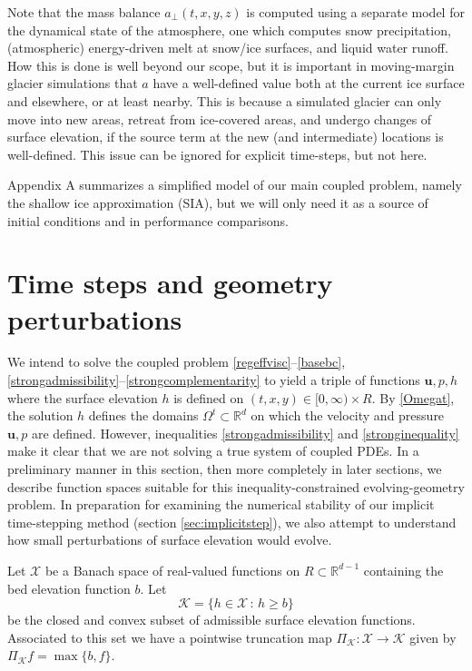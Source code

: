 \documentclass[letterpaper,final,12pt,reqno]{amsart}
\newcommand{\RR}{\mathbb{R}}
\newcommand{\bu}{\mathbf{u}}
\begin{document}
Note that the mass balance $a_{\perp}(t,x,y,z)$ is computed using a separate model for the dynamical state of the atmosphere, one which computes snow precipitation, (atmospheric) energy-driven melt at snow/ice surfaces, and liquid water runoff.  How this is done is well beyond our scope, but it is important in moving-margin glacier simulations that $a$ have a well-defined value both at the current ice surface and elsewhere, or at least nearby.  This is because a simulated glacier can only move into new areas, retreat from ice-covered areas, and undergo changes of surface elevation, if the source term at the new (and intermediate) locations is well-defined.  This issue can be ignored for explicit time-steps, but not here.

Appendix A summarizes a simplified model of our main coupled problem, namely the shallow ice approximation (SIA), but we will only need it as a source of initial conditions and in performance comparisons.


\section{Time steps and geometry perturbations} \label{sec:perturb}

We intend to solve the coupled problem \eqref{regeffvisc}--\eqref{basebc}, \eqref{strongadmissibility}--\eqref{strongcomplementarity} to yield a triple of functions $\bu,p,h$ where the surface elevation $h$ is defined on $(t,x,y) \in [0,\infty)\times R$.  By \eqref{Omegat}, the solution $h$ defines the domains $\Omega^t\subset \RR^d$ on which the velocity and pressure $\bu,p$ are defined.  However, inequalities \eqref{strongadmissibility} and \eqref{stronginequality} make it clear that we are not solving a true system of coupled PDEs.  In a preliminary manner in this section, then more completely in later sections, we describe function spaces suitable for this inequality-constrained evolving-geometry problem.  In preparation for examining the numerical stability of our implicit time-stepping method (section \ref{sec:implicitstep}), we also attempt to understand how small perturbations of surface elevation would evolve.

\newcommand{\PiK}{\Pi_{\mathcal{K}}}

Let $\mathcal{X}$ be a Banach space of real-valued functions on $R \subset \RR^{d-1}$ containing the bed elevation function $b$.  Let
    $$\mathcal{K} = \{h \in \mathcal{X}\,:\,h \ge b\}$$
be the closed and convex subset of admissible surface elevation functions.  Associated to this set we have a pointwise truncation map $\PiK : \mathcal{X} \to \mathcal{K}$ given by $\PiK f = \max\{b,f\}$.
\end{document}
